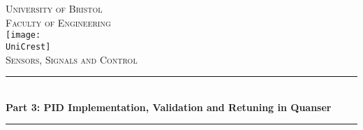 \documentclass[11pt]{article}
\newcommand{\AssignmentTitle}{Part 3: PID Implementation, Validation and Retuning in Quanser}
\newcommand{\ModuleTitle}{Sensors, Signals and Control}
\newcommand{\University}{University of Bristol}
\newcommand{\Faculty}{Faculty of Engineering}
\newcommand{\UniCrest}{crestbris.png}
\newcommand{\horrule}[1]{\rule{\linewidth}{#1}}
\begin{document}
  \setlength{\abovedisplayskip}{-14pt}
  \setlength{\belowdisplayskip}{2pt}
  \setlength{\abovedisplayshortskip}{-14pt}
  \setlength{\belowdisplayshortskip}{2pt}



\begin{titlepage}

	\center %
		\normalfont \normalsize \textsc{\University} \\ [10pt]
		\normalfont \normalsize \textsc{\Faculty} \\ [25pt]
		\texttt{[image: \\UniCrest]}\\[0.5cm]
		\normalfont \normalsize \textsc{\ModuleTitle} \\ [25pt]
		\horrule{0.5pt} \\[0.4cm]
		\huge \textbf{\AssignmentTitle} \\
		\horrule{2pt} \\[0.5cm]

\end{titlepage}
\end{document}
